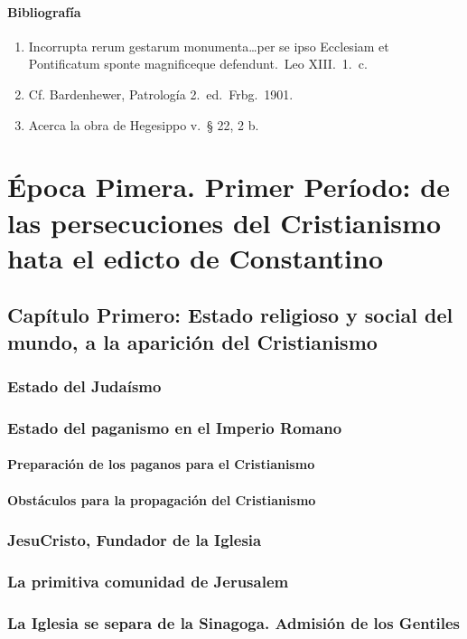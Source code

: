 \raggedbottom{} \documentclass[12pt, a4paper]{book}
\begin{document}
\subsection{Bibliografía}
\begin{enumerate}
  \item Incorrupta rerum gestarum monumenta\ldots per se ipso Ecclesiam et Pontificatum sponte magnificeque defendunt.\ Leo XIII.\ 1.\ c.\
  \item Cf. Bardenhewer, Patrología 2.\ ed.\ Frbg.\ 1901.
  \item Acerca la obra de Hegesippo v.\ § 22, 2 b.\
\end{enumerate}
\part{Época Pimera. Primer Período: de las persecuciones del Cristianismo hata el edicto de Constantino}
\chapter{Capítulo Primero: Estado religioso y social del mundo, a la aparición del Cristianismo}
\section{Estado del Judaísmo}
\section{Estado del paganismo en el Imperio Romano}
\subsection{Preparación de los paganos para el Cristianismo}
\subsection{Obstáculos para la propagación del Cristianismo}
\section{JesuCristo, Fundador de la Iglesia}
\section{La primitiva comunidad de Jerusalem}
\section{La Iglesia se separa de la Sinagoga. Admisión de los Gentiles}
\end{document}
